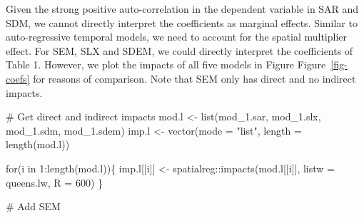 \documentclass[
  letterpaper,
]{scrbook}
\newenvironment{Shaded}{\begin{snugshade}}{\end{snugshade}}
\newcommand{\AttributeTok}[1]{\textcolor[rgb]{0.40,0.45,0.13}{#1}}
\newcommand{\CommentTok}[1]{\textcolor[rgb]{0.37,0.37,0.37}{#1}}
\newcommand{\ControlFlowTok}[1]{\textcolor[rgb]{0.00,0.23,0.31}{#1}}
\newcommand{\DecValTok}[1]{\textcolor[rgb]{0.68,0.00,0.00}{#1}}
\newcommand{\FunctionTok}[1]{\textcolor[rgb]{0.28,0.35,0.67}{#1}}
\newcommand{\NormalTok}[1]{\textcolor[rgb]{0.00,0.23,0.31}{#1}}
\newcommand{\OtherTok}[1]{\textcolor[rgb]{0.00,0.23,0.31}{#1}}
\newcommand{\SpecialCharTok}[1]{\textcolor[rgb]{0.37,0.37,0.37}{#1}}
\newcommand{\StringTok}[1]{\textcolor[rgb]{0.13,0.47,0.30}{#1}}
\begin{document}
Given the strong positive auto-correlation in the dependent variable in
SAR and SDM, we cannot directly interpret the coefficients as marginal
effects. Similar to auto-regressive temporal models, we need to account
for the spatial multiplier effect. For SEM, SLX and SDEM, we could
directly interpret the coefficients of Table 1. However, we plot the
impacts of all five models in Figure Figure~\ref{fig-coefs} for reasons
of comparison. Note that SEM only has direct and no indirect impacts.

\begin{Shaded}
\begin{Highlighting}[]
\CommentTok{\# Get direct and indirect impacts}
\NormalTok{mod.l }\OtherTok{\textless{}{-}} \FunctionTok{list}\NormalTok{(mod\_1.sar, mod\_1.slx, mod\_1.sdm, mod\_1.sdem)}
\NormalTok{imp.l }\OtherTok{\textless{}{-}} \FunctionTok{vector}\NormalTok{(}\AttributeTok{mode =} \StringTok{"list"}\NormalTok{, }\AttributeTok{length =} \FunctionTok{length}\NormalTok{(mod.l))}

\ControlFlowTok{for}\NormalTok{(i }\ControlFlowTok{in} \DecValTok{1}\SpecialCharTok{:}\FunctionTok{length}\NormalTok{(mod.l))\{}
\NormalTok{  imp.l[[i]] }\OtherTok{\textless{}{-}}\NormalTok{ spatialreg}\SpecialCharTok{::}\FunctionTok{impacts}\NormalTok{(mod.l[[i]], }\AttributeTok{listw =}\NormalTok{ queens.lw, }\AttributeTok{R =} \DecValTok{600}\NormalTok{)}
\NormalTok{\}}

\CommentTok{\# Add SEM}



\end{Highlighting}
\end{Shaded}
\end{document}
